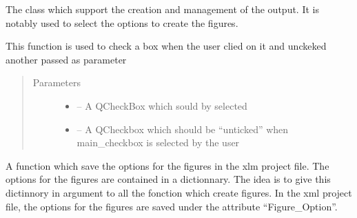 \documentclass[letterpaper,10pt,english]{sphinxmanual}
\begin{document}
\begin{fulllineitems}
\label{\detokenize{index:src_GUI.output_fig_GUI.outputW}}
The class which support the creation and management of the output. It is notably used to select the options to
create the figures.

\begin{fulllineitems}
\label{\detokenize{index:src_GUI.output_fig_GUI.outputW.check_uncheck}}
This function is used to check a box when the user clied on it and unckeked another passed as parameter
\begin{quote}\begin{description}
\item[{Parameters}] \leavevmode\begin{itemize}
\item {} 
 -- A QCheckBox which sould by selected

\item {} 
 -- A QCheckbox which should be ``unticked'' when main\_checkbox is selected by the user

\end{itemize}

\end{description}\end{quote}

\end{fulllineitems}


\begin{fulllineitems}
\label{\detokenize{index:src_GUI.output_fig_GUI.outputW.init_iu}}
\end{fulllineitems}


\begin{fulllineitems}
\label{\detokenize{index:src_GUI.output_fig_GUI.outputW.save_option_fig}}
A function which save the options for the figures in the xlm project file. The options for the figures are
contained in a dictionnary. The idea is to give this dictinnory in argument to all the fonction which create
figures. In the xml project file, the options for the figures are saved under the attribute ``Figure\_Option''.


\end{fulllineitems}
\end{fulllineitems}
\end{document}
